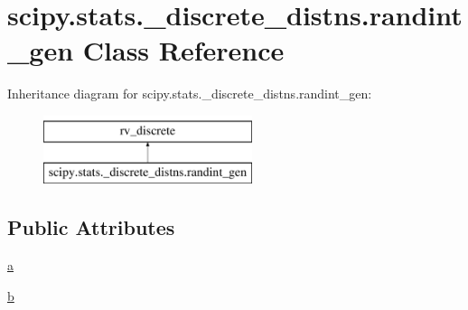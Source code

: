 \hypertarget{classscipy_1_1stats_1_1__discrete__distns_1_1randint__gen}{}\section{scipy.\+stats.\+\_\+discrete\+\_\+distns.\+randint\+\_\+gen Class Reference}
\label{classscipy_1_1stats_1_1__discrete__distns_1_1randint__gen}
Inheritance diagram for scipy.\+stats.\+\_\+discrete\+\_\+distns.\+randint\+\_\+gen\+:\begin{figure}[H]
\begin{center}
\leavevmode
\includegraphics[height=2.000000cm]{classscipy_1_1stats_1_1__discrete__distns_1_1randint__gen}
\end{center}
\end{figure}
\subsection*{Public Attributes}
\begin{DoxyCompactItemize}
\item 
\hyperlink{classscipy_1_1stats_1_1__discrete__distns_1_1randint__gen_a32822cdf3269aec69011b847ec9749de}{a}
\item 
\hyperlink{classscipy_1_1stats_1_1__discrete__distns_1_1randint__gen_abf8f01764c47c3f132971f9409ccfd3e}{b}
\end{DoxyCompactItemize}


